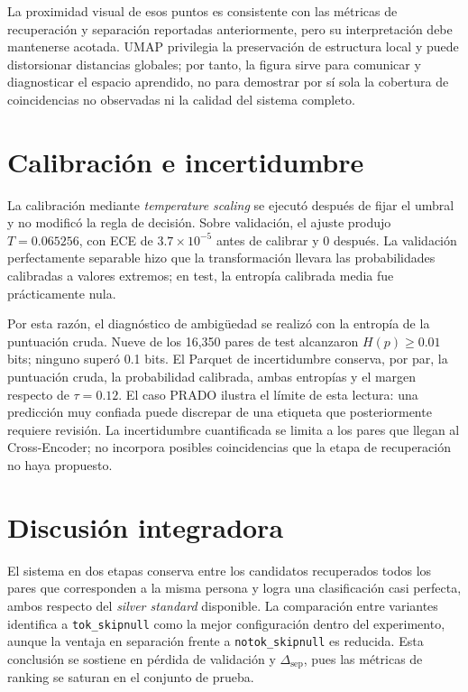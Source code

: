 La proximidad visual de esos puntos es consistente con las métricas de recuperación y separación reportadas anteriormente, pero su interpretación debe mantenerse acotada. UMAP privilegia la preservación de estructura local y puede distorsionar distancias globales; por tanto, la figura sirve para comunicar y diagnosticar el espacio aprendido, no para demostrar por sí sola la cobertura de coincidencias no observadas ni la calidad del sistema completo.


\section{Calibración e incertidumbre}

La calibración mediante \textit{temperature scaling} se ejecutó después de fijar el umbral y no modificó la regla de decisión. Sobre validación, el ajuste produjo $T=0.065256$, con ECE de $3.7\times10^{-5}$ antes de calibrar y 0 después. La validación perfectamente separable hizo que la transformación llevara las probabilidades calibradas a valores extremos; en test, la entropía calibrada media fue prácticamente nula.

Por esta razón, el diagnóstico de ambigüedad se realizó con la entropía de la puntuación cruda. Nueve de los 16,350 pares de test alcanzaron $H(p)\geq0.01$ bits; ninguno superó 0.1 bits. El Parquet de incertidumbre conserva, por par, la puntuación cruda, la probabilidad calibrada, ambas entropías y el margen respecto de $\tau=0.12$. El caso PRADO ilustra el límite de esta lectura: una predicción muy confiada puede discrepar de una etiqueta que posteriormente requiere revisión. La incertidumbre cuantificada se limita a los pares que llegan al Cross-Encoder; no incorpora posibles coincidencias que la etapa de recuperación no haya propuesto.


\section{Discusión integradora}

El sistema en dos etapas conserva entre los candidatos recuperados todos los pares que corresponden a la misma persona y logra una clasificación casi perfecta, ambos respecto del \textit{silver standard} disponible. La comparación entre variantes identifica a \texttt{tok\_skipnull} como la mejor configuración dentro del experimento, aunque la ventaja en separación frente a \texttt{notok\_skipnull} es reducida. Esta conclusión se sostiene en pérdida de validación y $\Delta_{\mathrm{sep}}$, pues las métricas de ranking se saturan en el conjunto de prueba.

